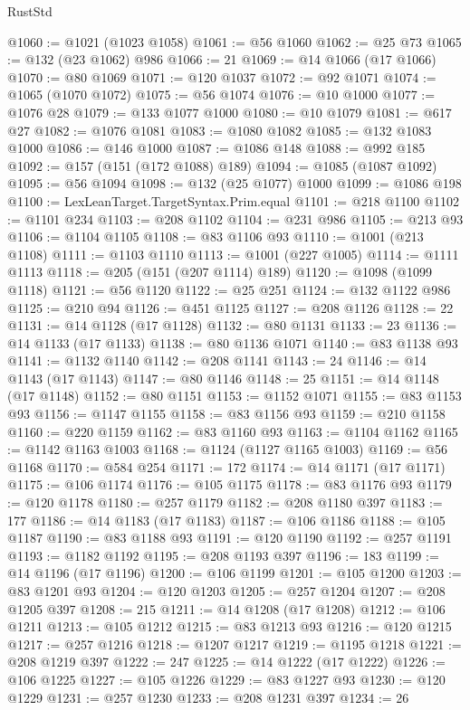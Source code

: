 \begin{lexlean}{RustStd}
\begin{coremodule}
@1060 := @1021 (@1023 @1058)
@1061 := @56 @1060
@1062 := @25 @73
@1065 := @132 (@23 @1062) @986
@1066 := 21
@1069 := @14 @1066 (@17 @1066)
@1070 := @80 @1069
@1071 := @120 @1037
@1072 := @92 @1071
@1074 := @1065 (@1070 @1072)
@1075 := @56 @1074
@1076 := @10 @1000
@1077 := @1076 @28
@1079 := @133 @1077 @1000
@1080 := @10 @1079
@1081 := @617 @27
@1082 := @1076 @1081
@1083 := @1080 @1082
@1085 := @132 @1083 @1000
@1086 := @146 @1000
@1087 := @1086 @148
@1088 := @992 @185
@1092 := @157 (@151 (@172 @1088) @189)
@1094 := @1085 (@1087 @1092)
@1095 := @56 @1094
@1098 := @132 (@25 @1077) @1000
@1099 := @1086 @198
@1100 := LexLeanTarget.TargetSyntax.Prim.equal
@1101 := @218 @1100
@1102 := @1101 @234
@1103 := @208 @1102
@1104 := @231 @986
@1105 := @213 @93
@1106 := @1104 @1105
@1108 := @83 @1106 @93
@1110 := @1001 (@213 @1108)
@1111 := @1103 @1110
@1113 := @1001 (@227 @1005)
@1114 := @1111 @1113
@1118 := @205 (@151 (@207 @1114) @189)
@1120 := @1098 (@1099 @1118)
@1121 := @56 @1120
@1122 := @25 @251
@1124 := @132 @1122 @986
@1125 := @210 @94
@1126 := @451 @1125
@1127 := @208 @1126
@1128 := 22
@1131 := @14 @1128 (@17 @1128)
@1132 := @80 @1131
@1133 := 23
@1136 := @14 @1133 (@17 @1133)
@1138 := @80 @1136 @1071
@1140 := @83 @1138 @93
@1141 := @1132 @1140
@1142 := @208 @1141
@1143 := 24
@1146 := @14 @1143 (@17 @1143)
@1147 := @80 @1146
@1148 := 25
@1151 := @14 @1148 (@17 @1148)
@1152 := @80 @1151
@1153 := @1152 @1071
@1155 := @83 @1153 @93
@1156 := @1147 @1155
@1158 := @83 @1156 @93
@1159 := @210 @1158
@1160 := @220 @1159
@1162 := @83 @1160 @93
@1163 := @1104 @1162
@1165 := @1142 @1163 @1003
@1168 := @1124 (@1127 @1165 @1003)
@1169 := @56 @1168
@1170 := @584 @254
@1171 := 172
@1174 := @14 @1171 (@17 @1171)
@1175 := @106 @1174
@1176 := @105 @1175
@1178 := @83 @1176 @93
@1179 := @120 @1178
@1180 := @257 @1179
@1182 := @208 @1180 @397
@1183 := 177
@1186 := @14 @1183 (@17 @1183)
@1187 := @106 @1186
@1188 := @105 @1187
@1190 := @83 @1188 @93
@1191 := @120 @1190
@1192 := @257 @1191
@1193 := @1182 @1192
@1195 := @208 @1193 @397
@1196 := 183
@1199 := @14 @1196 (@17 @1196)
@1200 := @106 @1199
@1201 := @105 @1200
@1203 := @83 @1201 @93
@1204 := @120 @1203
@1205 := @257 @1204
@1207 := @208 @1205 @397
@1208 := 215
@1211 := @14 @1208 (@17 @1208)
@1212 := @106 @1211
@1213 := @105 @1212
@1215 := @83 @1213 @93
@1216 := @120 @1215
@1217 := @257 @1216
@1218 := @1207 @1217
@1219 := @1195 @1218
@1221 := @208 @1219 @397
@1222 := 247
@1225 := @14 @1222 (@17 @1222)
@1226 := @106 @1225
@1227 := @105 @1226
@1229 := @83 @1227 @93
@1230 := @120 @1229
@1231 := @257 @1230
@1233 := @208 @1231 @397
@1234 := 26

\end{coremodule}
\end{lexlean}
